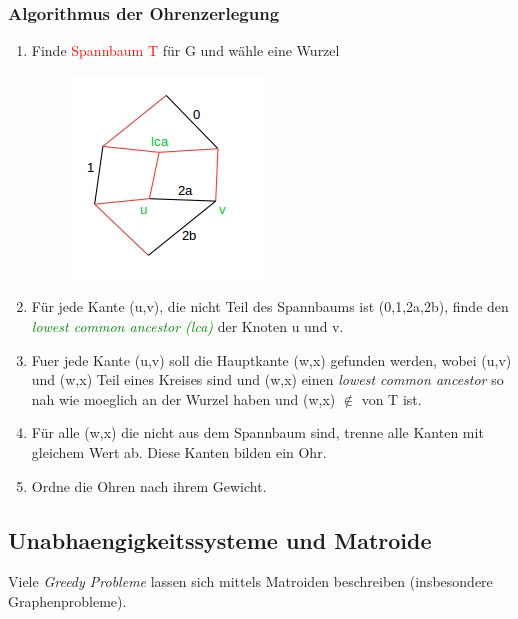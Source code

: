 \subsubsection{Algorithmus der Ohrenzerlegung}
\begin{enumerate}
	\item Finde \textcolor{red}{Spannbaum T} für G und wähle eine Wurzel\\
		\begin{figure}[htp]
		\centering
		\includegraphics[scale=1.00]{lectures/161111/pix/pic2.jpg}
		\end{figure}
	\item Für jede Kante (u,v), die nicht Teil des Spannbaums ist (0,1,2a,2b), finde den \textit{\textcolor{green}{lowest common ancestor (lca)}} der Knoten u und v.
	\item Fuer jede Kante (u,v) soll die Hauptkante (w,x) gefunden werden, wobei (u,v) und (w,x) Teil eines Kreises sind und (w,x) einen \textit{lowest common ancestor} so nah wie moeglich an der Wurzel haben und (w,x) $\notin$ von T ist.
	\item Für alle (w,x) die nicht aus dem Spannbaum sind, trenne alle Kanten mit gleichem Wert ab. Diese Kanten bilden ein Ohr.
	\item Ordne die Ohren nach ihrem Gewicht. 
\end{enumerate}

\newpage
\subsection{Unabhaengigkeitssysteme und Matroide}

Viele \textit{Greedy Probleme} lassen sich mittels Matroiden beschreiben (insbesondere Graphenprobleme).

